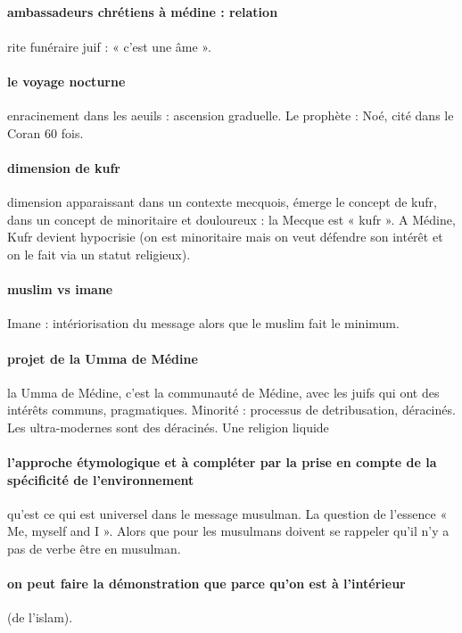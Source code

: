 \paragraph{ambassadeurs chrétiens à médine : relation}
\paragraph{} rite funéraire juif : « c’est une âme ». 
\paragraph{le voyage nocturne} enracinement dans les aeuils : ascension graduelle.  Le prophète : Noé, cité dans le Coran 60 fois. 

\paragraph{dimension de kufr} dimension apparaissant dans un contexte mecquois, émerge le concept de kufr, dans un concept de minoritaire et douloureux : la Mecque est « kufr ».
A Médine, Kufr devient hypocrisie (on est minoritaire mais on veut défendre son intérêt et on le fait via un statut religieux).
\paragraph{muslim vs imane} Imane : intériorisation du message alors que le muslim fait le minimum.  
\paragraph{projet de la Umma de Médine} la Umma de Médine, c’est la communauté de Médine, avec les juifs qui ont des intérêts communs, pragmatiques.  Minorité : processus de detribusation, déracinés. Les ultra-modernes sont des déracinés. Une religion liquide 

\paragraph{l’approche étymologique et à compléter par la prise en compte de la spécificité de l’environnement } qu’est ce qui est universel dans le message musulman. La question de l’essence « Me, myself and I ». Alors que pour les musulmans doivent se rappeler qu’il n’y a pas de verbe être en musulman.

\paragraph{on peut faire la démonstration que parce qu’on est à l’intérieur } (de l’islam). 

